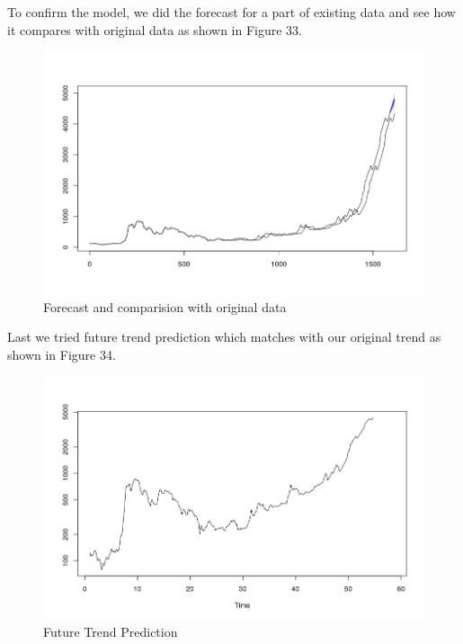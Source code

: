 \documentclass{article}
\begin{document}
To confirm the model, we did the forecast for a part of existing data and see how it compares with original data as shown in Figure 33.

\begin{figure}[ht]
	\centering
	\includegraphics[scale=0.25]{ForecastedImageH25.png}
	\caption{Forecast and comparision with original data}
	\label{fig: Forecast and Comparision with original data}
\end{figure}

Last we tried future trend prediction which matches with our original trend as shown in Figure 34.

\begin{figure}[ht]
	\centering
	\includegraphics[scale=0.25]{FutureTrendPrediction.png}
	\caption{Future Trend Prediction}
	\label{fig: Future Trend Prediction}
\end{figure}

\newpage
\end{document}
